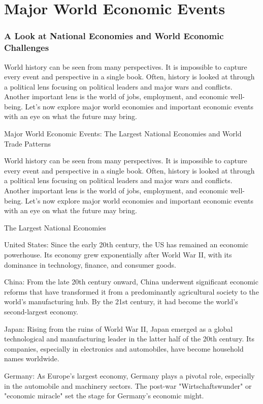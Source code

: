\chapter{Major World Economic Events}
\subsection*{A Look at National Economies and World Economic Challenges}
World history can be seen from many perspectives. It is impossible to capture every event and perspective in a single book. Often, history is looked at through a political lens focusing on political leaders and major wars and conflicts. Another important lens is the world of jobs, employment, and economic well-being. Let's now explore major world economies and important economic events with an eye on what the future may bring.

Major World Economic Events: The Largest National Economies and World Trade Patterns

World history can be seen from many perspectives. It is impossible to capture every event and perspective in a single book. Often, history is looked at through a political lens focusing on political leaders and major wars and conflicts. Another important lens is the world of jobs, employment, and economic well-being. Let's now explore major world economies and important economic events with an eye on what the future may bring.

The Largest National Economies

United States: Since the early 20th century, the US has remained an economic powerhouse. Its economy grew exponentially after World War II, with its dominance in technology, finance, and consumer goods.

China: From the late 20th century onward, China underwent significant economic reforms that have transformed it from a predominantly agricultural society to the world's manufacturing hub. By the 21st century, it had become the world's second-largest economy.

Japan: Rising from the ruins of World War II, Japan emerged as a global technological and manufacturing leader in the latter half of the 20th century. Its companies, especially in electronics and automobiles, have become household names worldwide.

Germany: As Europe's largest economy, Germany plays a pivotal role, especially in the automobile and machinery sectors. The post-war "Wirtschaftswunder" or "economic miracle" set the stage for Germany's economic might.

